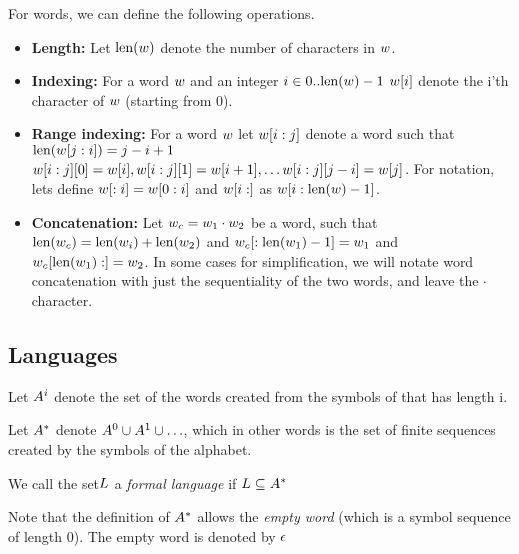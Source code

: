 For words, we can define the following operations.

\begin{itemize}
	\item \textbf{Length:} Let $\text{len}(w)$ denote the number of characters in $w$.
	\item \textbf{Indexing:} For a word $w$ and an integer $i \in 0.. \text{len}(w)-1$ $w[i]$ denote the i'th character of $w$ (starting from 0).
	\item \textbf{Range indexing:} For a word $w$ let $w[i:j]$ denote a word such that $\text{len}(w[j:i]) = j-i+1$ $w[i:j][0] = w[i], w[i:j][1] = w[i+1], \ldots w[i:j][j-i] = w[j]$. For notation, lets define $w[:i] = w[0:i]$ and $w[i:]$ as $w[i: \text{len}(w) -1]$.
	\item \textbf{Concatenation:} Let $w_{c} = w_{1} \cdot w_{2}$ be a word, such that $\text{len}(w_{c}) = \text{len}(w_{i}) + \text{len}(w_{2})$ and $w_{c}[: \text{len}(w_{1}) -1] = w_{1}$ and $w_{c}[\text{len}(w_{1}) :] = w_{2}$. In some cases for simplification, we will notate word concatenation with just the sequentiality of the two words, and leave the $\cdot$ character.
\end{itemize}

\subsection{Languages}

Let $A^{i}$ denote the set of the words created from the symbols of \alphabet{} that has length i. 

Let $A^{*}$ denote $A^0 \cup A^1 \cup \ldots$, which in other words is the set of finite sequences created by the symbols of the alphabet.

\begin{definition}
	We call the set$ L{}$ a \emph{formal language} if $L{} \subseteq A^{*}$
\end{definition}

Note that the definition of $A^{*}$ allows the \emph{empty word} (which is a symbol sequence of length 0). The empty word is denoted by $\epsilon{}$

